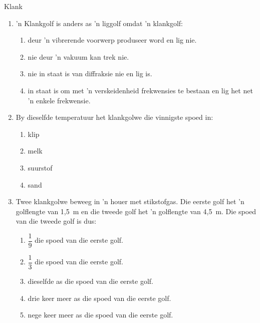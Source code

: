 \begin{eocexercises}{Klank}
\begin{enumerate}[noitemsep, label=\textbf{\arabic*}. ]
\item 'n Klankgolf is anders as 'n liggolf omdat 'n klankgolf:
\begin{enumerate}[noitemsep, label=\textbf{\alph*}. ] 
    \item deur 'n vibrerende voorwerp produseer word en lig nie.
    \item nie deur 'n vakuum kan trek nie.
    \item nie in staat is van diffraksie nie en lig is.
    \item in staat is om met 'n verskeidenheid frekwensies te bestaan en lig het net 'n enkele frekwensie. 
\end{enumerate}

\item By dieselfde temperatuur het klankgolwe die vinnigste spoed in:
\begin{enumerate}[noitemsep, label=\textbf{\alph*}. ] 
    \item klip
    \item melk
    \item suurstof
    \item sand
\end{enumerate}
                
\item Twee klankgolwe beweeg in 'n houer met stikstofgas. Die eerste golf het 'n golflengte van 1,5~m en die tweede golf het 'n golflengte van 4,5~m. Die spoed van die tweede golf is dus:
\begin{enumerate}[itemsep=5pt, label=\textbf{\alph*}. ] 
    \item $\dfrac{1}{9}$ die spoed van die eerste golf.
    \item $\dfrac{1}{3}$ die spoed van die eerste golf.
    \item dieselfde as die spoed van die eerste golf.
    \item drie keer meer as die spoed van die eerste golf.
    \item nege keer meer as die spoed van die eerste golf.
\end{enumerate}




\end{enumerate}
\end{eocexercises}

